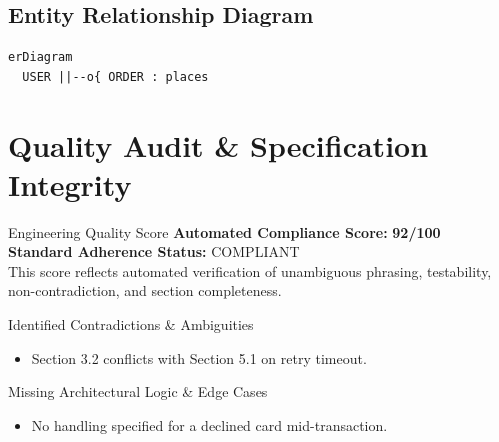 \documentclass[11pt,a4paper]{article}
\begin{document}
\subsection{Entity Relationship Diagram}
\begin{lstlisting}[language={},caption={Entity Relationship Model (Mermaid Source)}]
erDiagram
  USER ||--o{ ORDER : places
\end{lstlisting}

\section{Quality Audit \& Specification Integrity}

\begin{infobox}{Engineering Quality Score}
    \textbf{Automated Compliance Score:} \textcolor{sraaccent}{\textbf{92/100}}\\
    \textbf{Standard Adherence Status:} COMPLIANT\\
    \vspace{4pt}
    This score reflects automated verification of unambiguous phrasing, testability, non-contradiction, and section completeness.
\end{infobox}

\begin{warningbox}{Identified Contradictions \& Ambiguities}
\begin{itemize}[leftmargin=*]
    \item Section 3.2 conflicts with Section 5.1 on retry timeout.
\end{itemize}
\end{warningbox}

\begin{warningbox}{Missing Architectural Logic \& Edge Cases}
\begin{itemize}[leftmargin=*]
    \item No handling specified for a declined card mid-transaction.
\end{itemize}
\end{warningbox}
\end{document}
